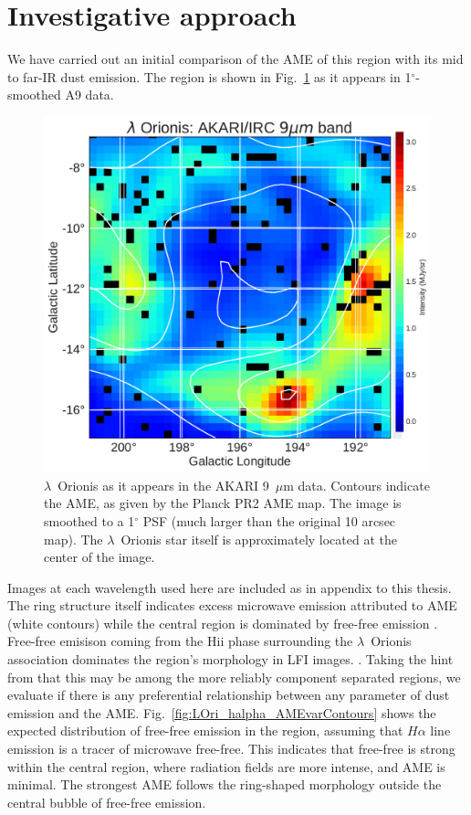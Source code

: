 \section{Investigative approach}
  We have carried out an initial comparison of the AME of this region with its mid to far-IR dust emission. The region is shown in Fig.~\ref{fig:orionis-akari9} as it appears in 1$^{\circ}$-smoothed A9 data.
      \begin{figure}
        \includegraphics[width=\textwidth]{../Plots/LOri_akari9_AMEcont_1dres.pdf}
        \centering
        \caption{$\lambda$~Orionis as it appears in the AKARI 9~$\mu$m data. Contours indicate the AME, as given by the Planck PR2 AME map. The image is smoothed to a 1$^{\circ}$ PSF (much larger than the original 10 arcsec map). The $\lambda$~Orionis star itself is approximately located at the center of the image.}
        \label{fig:orionis-akari9}
      \end{figure}
      Images at each wavelength used here are included as in appendix to this thesis.
   The ring structure itself indicates excess microwave emission attributed to AME (white contours) while the central region is dominated by free-free emission \citep{aran09, koenig15}. Free-free emisison coming from the Hii phase surrounding the $\lambda$~Orionis association dominates the region's morphology in LFI images. \citep{planck15XXV}. Taking the hint from \cite{planck15XXV} that this may be among the more reliably component separated regions, we evaluate if there is any preferential relationship between any parameter of dust emission and the AME. Fig.~\ref{fig:LOri_halpha_AMEvarContours} shows the expected distribution of free-free emission in the region, assuming that $H\alpha$ line emission is a tracer of microwave free-free. This indicates that free-free is strong within the central region, where radiation fields are more intense, and AME is minimal. The strongest AME follows the ring-shaped morphology outside the central bubble of free-free emission.
